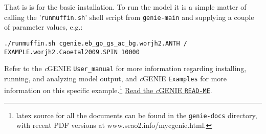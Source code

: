 \documentclass[10pt,twoside]{article}
\begin{document}
\noindent That is is for the basic installation. To run the model it is a simple matter of calling the  '\texttt{runmuffin.sh}'  shell script from \texttt{genie-main} and supplying a couple of parameter values, e.g.:
\vspace{-5pt}\small\begin{verbatim}./runmuffin.sh cgenie.eb_go_gs_ac_bg.worjh2.ANTH / EXAMPLE.worjh2.Caoetal2009.SPIN 10000\end{verbatim}\normalsize\vspace{-5pt}
Refer to the \textit{c}GENIE \texttt{User\_manual} for more information regarding installing, running, and analyzing model output, and \textit{c}GENIE \texttt{Examples} for more information on this specific example.\footnote{latex source for all the documents can be found in the \texttt{genie-docs} directory, with recent PDF versions at www.seao2.info/mycgenie.html.} \uline{Read the \textit{c}GENIE \texttt{READ-ME}}.

\end{document}
